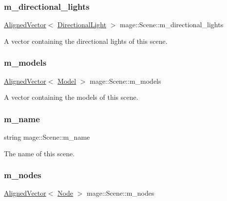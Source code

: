 \subsubsection{\texorpdfstring{m\+\_\+directional\+\_\+lights}{m\_directional\_lights}}
{\footnotesize\ttfamily \hyperlink{namespacemage_a8664bfb5ce2179fc64eae9f82c8a5ba8}{Aligned\+Vector}$<$ \hyperlink{classmage_1_1_directional_light}{Directional\+Light} $>$ mage\+::\+Scene\+::m\+\_\+directional\+\_\+lights\hspace{0.3cm}{\ttfamily [private]}}

A vector containing the directional lights of this scene. \hypertarget{classmage_1_1_scene_a5e37590d17c9bb0cc4f16ec7defb5180}{}\label{classmage_1_1_scene_a5e37590d17c9bb0cc4f16ec7defb5180} 
\subsubsection{\texorpdfstring{m\+\_\+models}{m\_models}}
{\footnotesize\ttfamily \hyperlink{namespacemage_a8664bfb5ce2179fc64eae9f82c8a5ba8}{Aligned\+Vector}$<$ \hyperlink{classmage_1_1_model}{Model} $>$ mage\+::\+Scene\+::m\+\_\+models\hspace{0.3cm}{\ttfamily [private]}}

A vector containing the models of this scene. \hypertarget{classmage_1_1_scene_a6cc8cb08b1853c4e3063b33a94e8fb47}{}\label{classmage_1_1_scene_a6cc8cb08b1853c4e3063b33a94e8fb47} 
\subsubsection{\texorpdfstring{m\+\_\+name}{m\_name}}
{\footnotesize\ttfamily string mage\+::\+Scene\+::m\+\_\+name\hspace{0.3cm}{\ttfamily [private]}}

The name of this scene. \hypertarget{classmage_1_1_scene_a270ac4a26210b95ba05957af19c4c43c}{}\label{classmage_1_1_scene_a270ac4a26210b95ba05957af19c4c43c} 
\subsubsection{\texorpdfstring{m\+\_\+nodes}{m\_nodes}}
{\footnotesize\ttfamily \hyperlink{namespacemage_a8664bfb5ce2179fc64eae9f82c8a5ba8}{Aligned\+Vector}$<$ \hyperlink{classmage_1_1_node}{Node} $>$ mage\+::\+Scene\+::m\+\_\+nodes\hspace{0.3cm}{\ttfamily [private]}}


